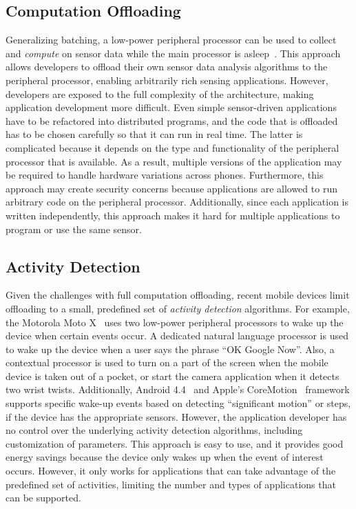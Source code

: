 \subsection{Computation Offloading}
\label{subsec:computationOffloading}

Generalizing batching, a low-power peripheral processor can be used to
collect and \emph{compute} on sensor data while the main processor is
asleep~\cite{reflex,turducken}.  This approach allows developers to
offload their own sensor data analysis algorithms to the peripheral
processor, enabling arbitrarily rich sensing applications.  However,
developers are exposed to the full complexity of the architecture,
making application development more difficult.  Even simple
sensor-driven applications have to be refactored into distributed
programs, and the code that is offloaded has to be chosen
carefully so that it can run in real time.  The latter is complicated
because it depends on the type and functionality of the peripheral
processor that is available.  As a result, multiple versions of the
application may be required to handle hardware variations across
phones.  Furthermore, this approach may create security concerns
because applications are allowed to run arbitrary code on the
peripheral processor.  Additionally, since each application is written independently,
this approach makes it hard for multiple applications to program or
use the same sensor.

\subsection{Activity Detection}

Given the challenges with full computation offloading, recent mobile
devices limit offloading to a small, predefined set of \emph{activity
detection} algorithms.  For example, the Motorola Moto X~\cite{motox}
uses two low-power peripheral processors to wake up the device when
certain events occur.  A dedicated natural language processor is used
to wake up the device when a user says the phrase ``OK Google Now''.  Also, 
a contextual processor is used to turn on a part of the screen
when the mobile device is taken out of a pocket, or start the camera
application when it detects two wrist twists.  Additionally, 
Android 4.4~\cite{android4.4} and Apple's CoreMotion~\cite{coreMotion} 
framework supports specific wake-up
events based on detecting ``significant motion'' or steps, if the device
has the appropriate sensors.  However, the application developer has no
control over the underlying activity detection algorithms, including
customization of parameters.  This approach is easy to use, and it
provides good energy savings because the device only wakes up when the
event of interest occurs.  However, it only works for applications that
can take advantage of the predefined set of activities, limiting the
number and types of applications that can be supported.

